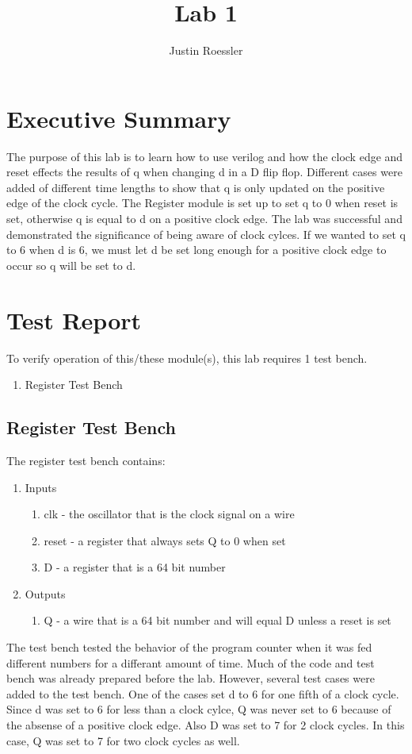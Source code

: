 \documentclass{article}
\author{Justin Roessler}
\title{Lab 1}
\begin{document}
\maketitle

\section{Executive Summary}
The purpose of this lab is to learn how to use verilog and how the clock edge and reset effects the results of q when changing d in a D flip flop. Different cases were added of different time lengths to show that q is only updated on the positive edge of the clock cycle. The Register module is set up to set q to 0 when reset is set, otherwise q is equal to d on a positive clock edge. The lab was successful and demonstrated the significance of being aware of clock cylces. If we wanted to set q to 6 when d is 6, we must let d be set long enough for a positive clock edge to occur so q will be set to d.


\section{Test Report}
To verify operation of this/these module(s), this lab requires 1 test bench.
\begin{enumerate}
	\item Register Test Bench
\end{enumerate}

\subsection{Register Test Bench}
The register test bench contains:
\begin{enumerate}
	\item Inputs
	\begin{enumerate}
		\item clk - the oscillator that is the clock signal on a wire
		\item reset - a register that always sets Q to 0 when set
		\item D - a register that is a 64 bit number
	\end{enumerate}	
	\item Outputs
	\begin{enumerate}	
		\item Q - a wire that is a 64 bit number and will equal D unless a reset is set
	\end{enumerate}
\end{enumerate} 
The test bench tested the behavior of the program counter when it was fed different numbers for a differant amount of time. Much of the code and test bench was already prepared before the lab. However, several test cases were added to the test bench. One of the cases set d to 6 for one fifth of a clock cycle. Since d was set to 6 for less than a clock cylce, Q was never set to 6 because of the absense of a positive clock edge. Also D was set to 7 for 2 clock cycles. In this case, Q was set to 7 for two clock cycles as well. 
\end{document}
